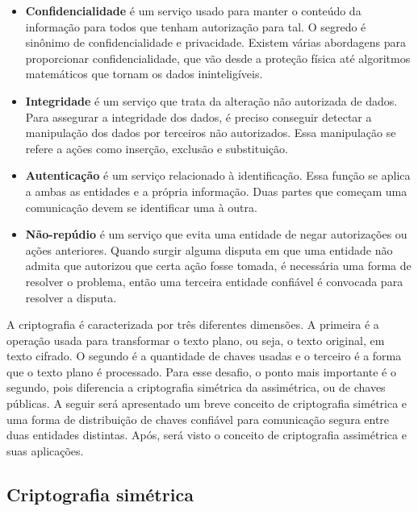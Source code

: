 \documentclass{article}
\begin{document}
\begin{itemize}
  \item \textbf{Confidencialidade} é um serviço usado para manter o conteúdo da
      informação para todos que tenham autorização para tal. O segredo
        é sinônimo de confidencialidade e privacidade. Existem várias
        abordagens para proporcionar confidencialidade, que vão desde
        a proteção física até algoritmos matemáticos que tornam os dados
        ininteligíveis.

  \item \textbf{Integridade} é um serviço que trata da alteração não autorizada
      de dados. Para assegurar a integridade dos dados, é preciso conseguir
        detectar a manipulação dos dados por terceiros não autorizados. Essa
        manipulação se refere a ações como inserção, exclusão e substituição.

  \item \textbf{Autenticação} é um serviço relacionado à identificação. Essa
      função se aplica a ambas as entidades e a própria informação. Duas partes
        que começam uma comunicação devem se identificar uma à outra.

  \item \textbf{Não-repúdio} é um serviço que evita uma entidade de negar
      autorizações ou ações anteriores. Quando surgir alguma disputa em que uma
        entidade não admita que autorizou que certa ação fosse tomada,
        é necessária uma forma de resolver o problema, então uma terceira
        entidade confiável é convocada para resolver a disputa.
\end{itemize}

A criptografia é caracterizada por três diferentes dimensões. A primeira
é a operação usada para transformar o texto plano, ou seja, o texto original,
em texto cifrado. O segundo é a quantidade de chaves usadas e o terceiro
é a forma que o texto plano é processado. Para esse desafio, o ponto mais
importante é o segundo, pois diferencia a criptografia simétrica da
assimétrica, ou de chaves públicas. A seguir será apresentado um breve conceito
de criptografia simétrica e uma forma de distribuição de chaves confiável para
comunicação segura entre duas entidades distintas. Após, será visto o conceito
de criptografia assimétrica e suas aplicações.

\subsection{Criptografia simétrica}\label{subsec:symmetric}
\end{document}

